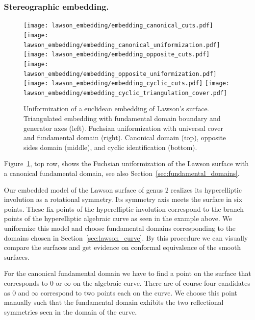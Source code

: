 \documentclass[Thesis]{subfiles}
\begin{document}
\subsubsection{Stereographic embedding.}

\begin{figure}
	\centering
	\resizebox{!}{6cm} {
	\texttt{[image: lawson\_embedding/embedding\_canonical\_cuts.pdf]}
	\texttt{[image: lawson\_embedding/embedding\_canonical\_uniformization.pdf]}
	}
	\resizebox{!}{6cm} {
	\texttt{[image: lawson\_embedding/embedding\_opposite\_cuts.pdf]}
	\texttt{[image: lawson\_embedding/embedding\_opposite\_uniformization.pdf]}
	}
	\resizebox{!}{6.5cm} {
	\texttt{[image: lawson\_embedding/embedding\_cyclic\_cuts.pdf]}
	\texttt{[image: lawson\_embedding/embedding\_cyclic\_triangulation\_cover.pdf]}
	}
	\caption{Uniformization of a euclidean embedding of Lawson's surface. Triangulated embedding with fundamental domain boundary and generator axes (left). Fuchsian uniformization with universal cover and fundamental domain (right). Canonical domain (top), opposite sides domain (middle), and cyclic identification (bottom).}
	\label{fig:lawson_embedding}
\end{figure}

Figure~\ref{fig:lawson_embedding}, top row, shows the Fuchsian uniformization of the Lawson surface with a canonical fundamental domain, see also Section~\ref{sec:fundamental_domains}.

Our embedded model of the Lawson surface of genus 2 realizes its hyperelliptic involution as a rotational symmetry.
Its symmetry axis meets the surface in six points. These fix points of the hyperelliptic involution correspond to the branch points of the hyperelliptic algebraic curve as seen in the example above. We uniformize this model and choose fundamental domains corresponding to the domains chosen in Section~\ref{sec:lawson_curve}. By this procedure we can visually compare the surfaces and get evidence on conformal equivalence of the smooth surfaces.

For the canonical fundamental domain we have to find a point on the surface that corresponds to $0$ or $\infty$ on the algebraic curve. There are of course four candidates as $0$ and $\infty$ correspond to two points each on the curve. We choose this point manually such that the fundamental domain exhibits the two reflectional symmetries seen in the domain of the curve.
\end{document}
